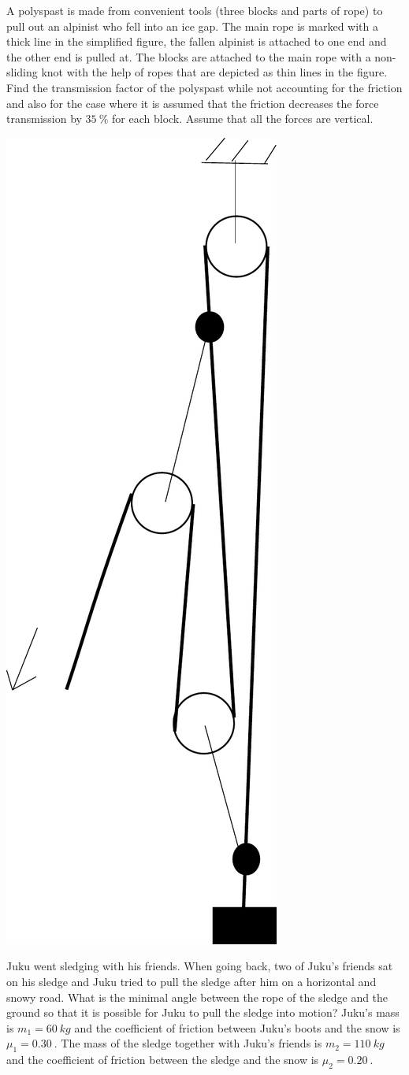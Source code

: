 \documentclass[11pt]{article}
\begin{document}
\probeng
A polyspast is made from convenient tools (three blocks and parts of rope) to pull out an alpinist who fell into an ice gap. The main rope is marked with a thick line in the simplified figure, the fallen alpinist is attached to one end and the other end is pulled at. The blocks are attached to the main rope with a non-sliding knot with the help of ropes that are depicted as thin lines in the figure. Find the transmission factor of the polyspast while not accounting for the friction and also for the case where it is assumed that the friction decreases the force transmission by $\SI{35}{\percent}$ for each block. Assume that all the forces are vertical.
\begin{center}
\includegraphics[width=0.25\linewidth]{2014-v3g-06-Polyspast}
\end{center}
\probend
\bigskip


\probeng
Juku went sledging with his friends. When going back, two of Juku’s friends sat on his sledge and Juku tried to pull the sledge after him on a horizontal and snowy road. What is the minimal angle between the rope of the sledge and the ground so that it is possible for Juku to pull the sledge into motion? Juku’s mass is $m_1 = \SI{60}{kg}$ and the coefficient of friction between Juku’s boots and the snow is $\mu_1 = \SI{0.30}{}$. The mass of the sledge together with Juku’s friends is $m_2 = \SI{110}{kg}$ and the coefficient of friction between the sledge and the snow is $\mu_2 = \SI{0.20}{}$.
\probend
\bigskip
\end{document}
